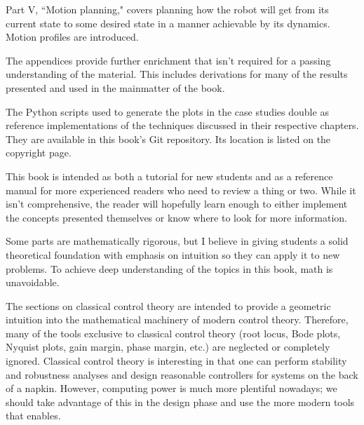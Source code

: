 Part V, ``Motion planning," covers planning how the robot will get from its
current state to some desired state in a manner achievable by its dynamics.
Motion profiles are introduced.

The appendices provide further enrichment that isn't required for a passing
understanding of the material. This includes derivations for many of the results
presented and used in the mainmatter of the book.

The Python scripts used to generate the plots in the case studies double as
reference implementations of the techniques discussed in their respective
chapters. They are available in this book's Git repository. Its location is
listed on the copyright page.

This book is intended as both a tutorial for new students and as a reference
manual for more experienced readers who need to review a thing or two. While it
isn't comprehensive, the reader will hopefully learn enough to either implement
the concepts presented themselves or know where to look for more information.

Some parts are mathematically rigorous, but I believe in giving students a solid
theoretical foundation with emphasis on intuition so they can apply it to new
problems. To achieve deep understanding of the topics in this book, math is
unavoidable.

The sections on classical control theory are intended to provide a geometric
intuition into the mathematical machinery of modern control theory. Therefore,
many of the tools exclusive to classical control theory (root locus, Bode plots,
Nyquist plots, gain margin, phase margin, etc.) are neglected or completely
ignored. Classical control theory is interesting in that one can perform
stability and robustness analyses and design reasonable controllers for systems
on the back of a napkin. However, computing power is much more plentiful
nowadays; we should take advantage of this in the design phase and use the more
modern tools that enables.

